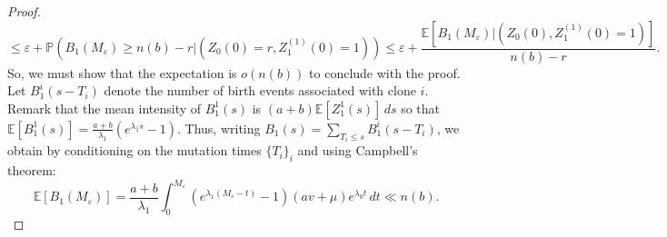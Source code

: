 \documentclass{article}
\numberwithin{equation}{section}
\begin{document}
\begin{proof}
    \[\leq \varepsilon+\mathbb{P}(B_1(M_\varepsilon)\geq n(b)-r|(Z_0(0)=r,Z_1^{(1)}(0)=1))\leq \varepsilon+\frac{\mathbb{E}[B_1(M_\varepsilon)|(Z_0(0),Z_1^{(1)}(0)=1)]}{n(b)-r}.\]
    So, we must show that the expectation is $o(n(b))$ to conclude with the proof. Let $B_1^i(s-T_i)$ denote the number of birth events associated with clone $i$. Remark that the mean intensity of $B_1^1(s)$ is $(a+b)\mathbb{E}[Z_1^1(s)]\,ds$ so that $\mathbb{E}[B_1^1(s)]=\frac{a+b}{\lambda_1}\left(e^{\lambda_1 s}-1\right)$. Thus, writing $B_1(s)=\sum_{T_i\leq s}B_1^i(s-T_i)$, we obtain by conditioning on the mutation times $\{T_i\}_i$ and using Campbell's theorem:
    \[\mathbb{E}[B_1(M_\varepsilon)]=\frac{a+b}{\lambda_1}\int_0^{M_\varepsilon}\left(e^{\lambda_1 (M_\varepsilon-t)}-1\right)(av+\mu)e^{\lambda_0 t}\,dt\ll n(b).\]
\end{proof}
\end{document}
